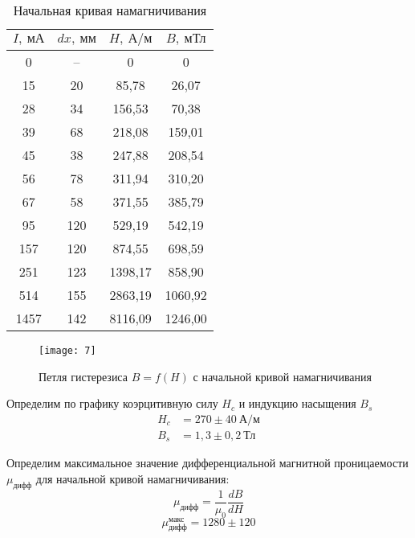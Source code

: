 \begin{table}[H]
\centering
\begin{tabular}{|c|c|c|c|}
\hline
$I, \ \text{мА}$    & $dx, \ \text{мм}$
& $H, \ \text{А/м}$       & $B, \
\text{мТл}$       \\ \hline
0    &  --   & 0       & 0       \\ \hline
15   & 20  & 85,78   & 26,07   \\ \hline
28   & 34  & 156,53  & 70,38   \\ \hline
39   & 68  & 218,08  & 159,01  \\ \hline
45   & 38  & 247,88  & 208,54  \\ \hline
56   & 78  & 311,94  & 310,20  \\ \hline
67   & 58  & 371,55  & 385,79  \\ \hline
95   & 120 & 529,19  & 542,19  \\ \hline
157  & 120 & 874,55  & 698,59  \\ \hline
251  & 123 & 1398,17 & 858,90  \\ \hline
514  & 155 & 2863,19 & 1060,92 \\ \hline
1457 & 142 & 8116,09 & 1246,00 \\ \hline
\end{tabular}
\captionsetup{justification=centering}
\caption{Начальная кривая намагничивания}
\end{table}

\begin{figure}[H]
    \texttt{[image: 7]} 
    \captionsetup{justification=centering}
    \caption{Петля гистерезиса $B = f(H)$ с
    начальной кривой намагничивания}
\end{figure}

Определим по графику коэрцитивную силу
$H_c$ и индукцию насыщения $B_s$
 \begin{equation*}
    \begin{aligned}
        H_c &= 270 \pm 40 \ \text{А/м}\\
        B_s &= 1,3 \pm 0,2 \ \text{Тл}
    \end{aligned}
\end{equation*}


Определим максимальное значение
дифференциальной магнитной проницаемости
$\mu_\text{дифф}$ для начальной кривой
намагничивания:
\[
    \mu_{\text{дифф}} =
    \frac{1}{\mu_0}\frac{dB}{dH}
\]
\[
    \mu_\text{дифф}^{\text{макс}} = 1280 \pm
    120
\]


